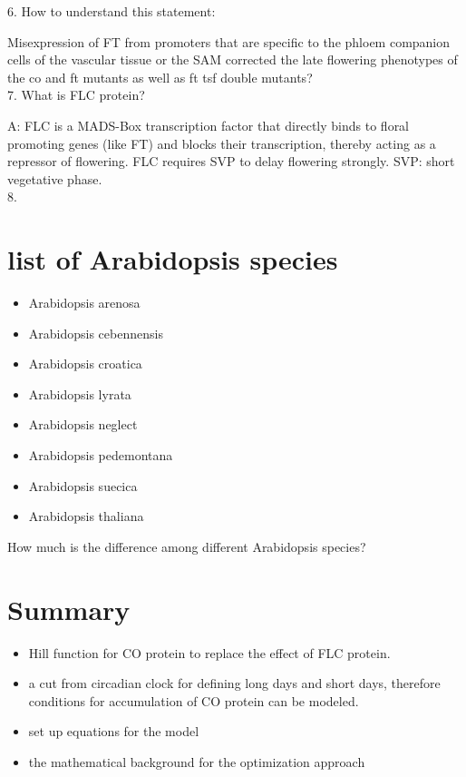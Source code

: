 \documentclass[paper=a4, fontsize=12pt]{scrartcl}	%
\numberwithin{equation}{section}					%
\numberwithin{figure}{section}					%
\numberwithin{table}{section}					%
\begin{document}
6. How to understand this statement: 

Misexpression of FT from promoters that are specific to the phloem companion cells of the vascular tissue or the SAM corrected the late flowering phenotypes of the co and ft mutants as well as ft tsf double mutants?\\

7. What is FLC protein?

A: FLC is a MADS-Box transcription factor that directly binds to floral promoting genes (like FT) and blocks their transcription, thereby acting as a repressor of flowering. FLC requires SVP to delay flowering strongly. SVP: short vegetative phase. \\

8. 


\section{list of Arabidopsis species}
\begin{itemize}
\item Arabidopsis arenosa
\item Arabidopsis cebennensis
\item Arabidopsis croatica
\item Arabidopsis lyrata
\item Arabidopsis neglect
\item Arabidopsis pedemontana
\item Arabidopsis suecica
\item Arabidopsis thaliana
\end{itemize}

How much is the difference among different Arabidopsis species?


\section{Summary}
\begin{itemize}
\item Hill function for CO protein to replace the effect of FLC protein. 
\item a cut from circadian clock for defining long days and short days, therefore conditions for accumulation of CO protein can be modeled. 
\item set up equations for the model
\item the mathematical background for the optimization approach
\end{itemize}
\end{document}
